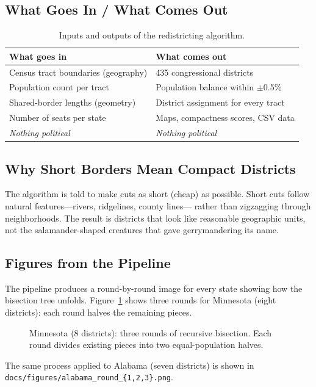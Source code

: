 \subsection*{What Goes In / What Comes Out}

\begin{table}[h]
\centering
\caption{Inputs and outputs of the redistricting algorithm.}
\label{tab:inout}
\begin{tabular}{@{}p{} p{}@{}}
\toprule
\textbf{What goes in} & \textbf{What comes out} \\
\midrule
Census tract boundaries (geography) &
  435 congressional districts \\
Population count per tract &
  Population balance within $\pm$0.5\% \\
Shared-border lengths (geometry) &
  District assignment for every tract \\
Number of seats per state &
  Maps, compactness scores, CSV data \\
\midrule
\emph{Nothing political} &
  \emph{Nothing political} \\
\bottomrule
\end{tabular}
\end{table}

\subsection*{Why Short Borders Mean Compact Districts}

The algorithm is told to make cuts as short (cheap) as possible.
Short cuts follow natural features---rivers, ridgelines, county lines---
rather than zigzagging through neighborhoods.
The result is districts that look like reasonable geographic units,
not the salamander-shaped creatures that gave gerrymandering its name.

\subsection*{Figures from the Pipeline}

The pipeline produces a round-by-round image for every state showing
how the bisection tree unfolds.
Figure~\ref{fig:mn} shows three rounds for Minnesota (eight districts):
each round halves the remaining pieces.

\begin{figure}[h]
\centering
{}
\caption{Minnesota (8 districts): three rounds of recursive bisection.
Each round divides existing pieces into two equal-population halves.}
\label{fig:mn}
\end{figure}

\noindent The same process applied to Alabama (seven districts) is shown in
\texttt{docs/figures/alabama\_round\_\{1,2,3\}.png}.
